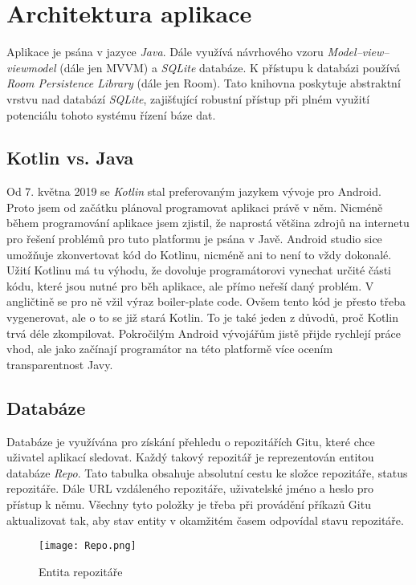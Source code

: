     \section{Architektura aplikace}
        Aplikace je psána v jazyce \emph{Java}. Dále využívá návrhového vzoru \emph{Model–view–viewmodel} (dále jen MVVM) a \emph{SQLite} databáze. K přístupu k databázi používá \emph{Room Persistence Library} (dále jen Room). Tato knihovna poskytuje abstraktní vrstvu nad databází \emph{SQLite}, zajišťující robustní přístup při plném využití potenciálu tohoto systému řízení báze dat.

        \subsection{Kotlin vs. Java}
        Od 7. května 2019 se \emph{Kotlin} stal preferovaným jazykem vývoje pro Android. Proto jsem od začátku plánoval programovat aplikaci právě v něm. Nicméně během programování aplikace jsem zjistil, že naprostá většina zdrojů na internetu pro řešení problémů pro tuto platformu je psána v Javě. Android studio sice umožňuje zkonvertovat kód do Kotlinu, nicméně ani to není to vždy dokonalé. Užití Kotlinu má tu výhodu, že dovoluje programátorovi vynechat určité části kódu, které jsou nutné pro běh aplikace, ale přímo neřeší daný problém. V angličtině se pro ně vžil výraz boiler-plate code. Ovšem tento kód je přesto třeba vygenerovat, ale o to se již stará Kotlin. To je také jeden z důvodů, proč Kotlin trvá déle zkompilovat. Pokročilým Android vývojářům jistě přijde rychlejí práce vhod, ale jako začínají programátor na této platformě více ocením transparentnost Javy.

        \newpage
        \subsection{Databáze}
        Databáze je využívána pro získání přehledu o repozitářích Gitu, které chce uživatel aplikací sledovat. Každý takový repozitář je reprezentován entitou databáze \emph{Repo}. Tato tabulka obsahuje absolutní cestu ke složce repozitáře, status repozitáře. Dále URL vzdáleného repozitáře, uživatelské jméno a heslo pro přístup k němu. Všechny tyto položky je třeba při provádění příkazů Gitu aktualizovat tak, aby stav entity v okamžitém časem odpovídal stavu repozitáře.

        \begin{figure}[h!]
            \centering
            \vspace{0.5cm}
            \texttt{[image: Repo.png]}
            \caption{Entita repozitáře}
            \label{RepoTable}
        \end{figure}

